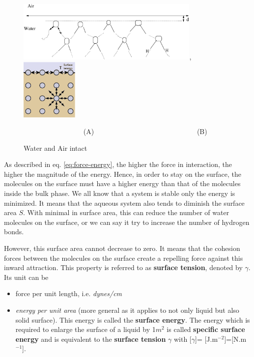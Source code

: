 \begin{figure}[htb]
  \centerline{\includegraphics[height=3cm]{./images/air_water.eps},
    \includegraphics[height=3cm]{./images/cohesion-surface_tension.eps}}
\begin{center}
\verb|                 |(A) \verb|                            | (B)
\end{center}
  \caption{Water and Air intact}\label{fig:air_water}
\end{figure}



As described in eq. \eqref{eq:force-energy}, the higher the force in
interaction, the higher the magnitude of the energy. Hence, in order
to stay on the surface, the molecules on the surface must have a
higher energy than that of the molecules inside the bulk phase. We all
know that a system is stable only the energy is minimized. It means
that the aqueous system also tends to diminish the surface area
$S$. With minimal in surface area, this can reduce the number of water
molecules on the surface, or we can say it try to increase the number
of hydrogen bonds. 

However, this surface area cannot decrease to zero.  It means that the
cohesion forces between the molecules on the surface create a
repelling force against this inward attraction. This property is
referred to as {\bf surface tension}, denoted by $\gamma$. Its unit
can be 
\begin{itemize}
\item force per unit length, i.e. {\it dynes/cm}
\item {\it energy per unit area} (more general as it applies to not
  only liquid but also solid surface). This energy is called the
  {\bf surface energy}. The energy which is required to enlarge the
  surface of a liquid by 1$m^2$ is called
  {\bf specific surface energy} and is equivalent to the
  {\bf surface tension} $\gamma$ with [$\gamma$]=
  [J.m$^{-2}$]=[N.m$^{-1}$].
\end{itemize}


